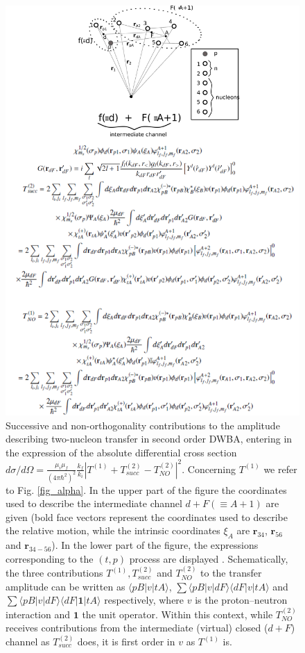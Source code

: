 \begin{figure}
\centerline{\includegraphics*[width=\textwidth,angle=0]{nutshell/figs/fig_beta.pdf}}
\caption{ 
	 Successive and non-orthogonality contributions to the  amplitude describing two-nucleon transfer in second order DWBA, entering in the expression of the absolute differential cross section $d\sigma/d\Omega=\tfrac{\mu_i\mu_f}{(4\pi\hbar^2)^2}\tfrac{k_f}{k_i}\left|T^{(1)}+T_{succ}^{(2)}-T^{(2)}_{NO}\right|^2$. Concerning $T^{(1)}$ we refer to Fig. \ref{fig_alpha}. In the upper part of the figure the coordinates used to describe the intermediate channel $d+F(\equiv A+1)$ are given (bold face vectors represent the coordinates used to describe the relative motion, while the intrinsic coordinates $\xi_A$ are $\mathbf r_{34}$, $\mathbf r_{56}$ and $\mathbf r_{34-56}$). In the lower part of the figure, the  expressions corresponding to the $(t,p)$ process are displayed \citep{Potel:13b}. Schematically, the three contributions $T^{(1)}, T^{(2)}_{succ}$ and $T^{(2)}_{NO}$ to the transfer amplitude can be written as $\langle pB|v|tA\rangle$, $\sum \langle pB|v|dF\rangle\langle dF|v|tA\rangle$ and $\sum \langle pB|v|dF\rangle\langle dF| \mathbf{1}|tA\rangle$ respectively, where $v$ is the proton--neutron interaction and $\mathbf 1$ the unit operator. Within this context, while $T^{(2)}_{NO}$ receives contributions from the intermediate (virtual) closed ($d+F$) channel as $T^{(2)}_{succ}$ does, it is first order in $v$ as $T^{(1)}$ is.}\label{fig_beta}
\end{figure}
